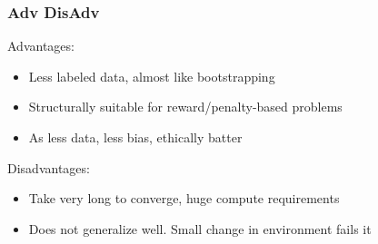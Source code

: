 

\begin{frame}[fragile]\frametitle{Adv DisAdv}

Advantages:
\begin{itemize}
\item Less labeled data, almost like bootstrapping
\item Structurally suitable for reward/penalty-based problems
\item As less data, less bias, ethically batter
\end{itemize}

Disadvantages:
\begin{itemize}
\item Take very long to converge, huge compute requirements
\item Does not generalize well. Small change in environment fails it
\end{itemize}

\end{frame}









